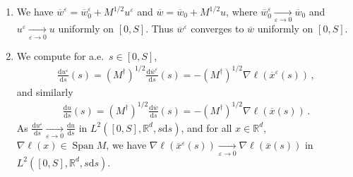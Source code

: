 \documentclass[11pt,english,reqno]{article}
\DeclareMathOperator{\Span}{Span}
\newcommand{\diff}{\mathrm{d}}
\newcommand{\R}{\mathbb{R}}
\theoremstyle{plain}
\theoremstyle{definition}
\theoremstyle{remark}
\numberwithin{equation}{section}
\begin{document}
\begin{enumerate}[label=(\alph*)]
	\item We have $\overline{w}^\varepsilon = \overline{w}_0^\varepsilon + M^{1/2} u^\varepsilon$ and $\overline{w} = \overline{w}_0 + M^{1/2} u$, where $\overline{w}_0^\varepsilon \xrightarrow[\varepsilon\to 0]{} \overline{w}_0$ and $u^\varepsilon \xrightarrow[\varepsilon\to 0]{} u$ uniformly on $[0,S]$. Thus $\overline{w}^\varepsilon$ converges to $\overline{w}$ uniformly on $[0,S]$. 
	\item 
	We compute for a.e.~$s \in [0,S]$,
	\begin{align*}
		\frac{\diff u^\varepsilon}{\diff s}(s) = (M^\dagger)^{1/2} \frac{\diff \overline{w}^\varepsilon}{\diff s}(s) = - (M^\dagger)^{1/2} \nabla \ell(\overline{x}^\varepsilon(s)) \, ,
	\end{align*}
	and similarly
	\begin{align*}
		\frac{\diff u}{\diff s}(s) = (M^\dagger)^{1/2} \frac{\diff \overline{w}}{\diff s}(s) = - (M^\dagger)^{1/2} \nabla \ell(\overline{x}(s)) \, .
	\end{align*}
	As $\displaystyle \frac{\diff u^\varepsilon}{\diff s} \xrightarrow[\varepsilon\to 0]{}\frac{\diff u}{\diff s}$ in $L^2([0,S], \R^d, s \diff s)$, and for all $x \in \R^d$, $\nabla \ell(x) \in \Span M$, we have $\displaystyle \nabla \ell(\overline{x}^\varepsilon(s)) \xrightarrow[\varepsilon\to 0]{} \nabla \ell(\overline{x}(s))$ in $L^2([0,S], \R^d, s \diff s)$.


\end{enumerate}
\end{document}
